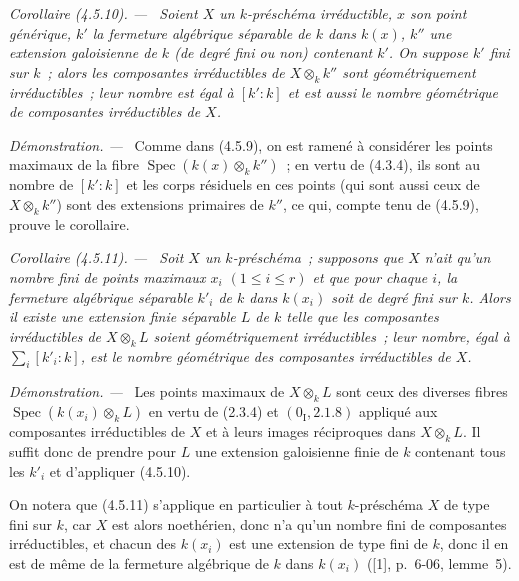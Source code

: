 \documentclass[10pt,oneside]{book}
\makeatletter
\newenvironment{corollary}[1][]{%
  \par\medskip\noindent\itshape Corollaire (#1). ---\ }{\par}
\newenvironment{proof}{%
  \par\medskip\noindent\textit{Démonstration. ---\ }}{\par}
\newcommand{\EGAReaderTarget}[2]{\hypertarget{#1}{}\@bsphack\begingroup\def\@currentHref{#1}\label{#2}\endgroup\@esphack}
\makeatother
\begin{document}
\begin{corollary}[4.5.10]
\label{IV.2.4.5.10-fr}
Soient $X$ un $k$-préschéma irréductible, $x$ son point générique, $k'$ la
fermeture algébrique séparable de $k$ dans $k(x)$, $k''$ une extension
galoisienne de $k$ (de degré fini ou non) contenant $k'$. On suppose $k'$ fini
sur $k$~; alors les composantes irréductibles de $X\otimes_k k''$ sont
géométriquement irréductibles~; leur nombre est égal à $[k':k]$ et est aussi le
nombre géométrique de composantes irréductibles de $X$.
\end{corollary}

\begin{proof}
Comme dans (4.5.9), on est ramené à considérer les points maximaux de la fibre
$\operatorname{Spec}(k(x)\otimes_k k'')$~; en vertu de (4.3.4), ils sont au
nombre de $[k':k]$ et les corps résiduels en ces points (qui sont aussi ceux de
$X\otimes_k k''$) sont des extensions primaires de $k''$, ce qui, compte tenu
de (4.5.9), prouve le corollaire.
\end{proof}

\begin{corollary}[4.5.11]
\EGAReaderTarget{ega4.c04.cor.4-5-11}{IV.2.4.5.11-fr}
Soit $X$ un $k$-préschéma~; supposons que $X$ n'ait qu'un nombre fini de
points maximaux $x_i$ $(1\leqslant i\leqslant r)$ et que pour chaque $i$, la
fermeture algébrique séparable $k'_i$ de $k$ dans $k(x_i)$ soit de degré fini
sur $k$. Alors il existe une extension finie séparable $L$ de $k$ telle que les
composantes irréductibles de $X\otimes_k L$ soient géométriquement
irréductibles~; leur nombre, égal à $\sum_i[k'_i:k]$, est le nombre géométrique
des composantes irréductibles de $X$.
\end{corollary}

\begin{proof}
Les points maximaux de $X\otimes_k L$ sont ceux des diverses fibres
$\operatorname{Spec}(k(x_i)\otimes_k L)$ en vertu de (2.3.4) et
$(0_{\mathrm I},2.1.8)$ appliqué aux composantes irréductibles de $X$ et à
leurs images réciproques dans $X\otimes_k L$. Il suffit donc de prendre pour
$L$ une extension galoisienne finie de $k$ contenant tous les $k'_i$ et
d'appliquer (4.5.10).
\end{proof}

On notera que (4.5.11) s'applique en particulier à tout $k$-préschéma $X$ de
type fini sur $k$, car $X$ est alors noethérien, donc n'a qu'un nombre fini de
composantes irréductibles, et chacun des $k(x_i)$ est une extension de type
fini de $k$, donc il en est de même de la fermeture algébrique de $k$ dans
$k(x_i)$ ([1], p.~6-06, lemme~5).
\end{document}
